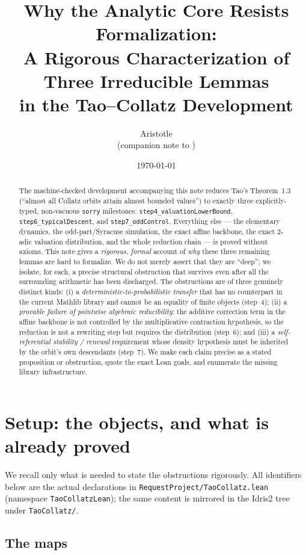 \documentclass[11pt]{article}
\title{\bfseries Why the Analytic Core Resists Formalization:\\
A Rigorous Characterization of Three Irreducible Lemmas\\
in the Tao--Collatz Development}
\author{Aristotle \\ \small (companion note to \code{RequestProject/TaoCollatz.lean})}
\date{\today}
\theoremstyle{plain}
\theoremstyle{definition}
\theoremstyle{remark}
\newcommand{\code}[1]{\texttt{\small #1}}
\begin{document}
\maketitle

\begin{abstract}
The machine-checked development accompanying this note reduces Tao's Theorem~1.3
(``almost all Collatz orbits attain almost bounded values'') to exactly three
explicitly-typed, non-vacuous \code{sorry} milestones:
\code{step4\_valuationLowerBound}, \code{step6\_typicalDescent}, and
\code{step7\_oddControl}. Everything else --- the elementary dynamics, the
odd-part/Syracuse simulation, the exact affine backbone, the exact $2$-adic
valuation distribution, and the whole reduction chain --- is proved without
axioms. This note gives a \emph{rigorous, formal} account of \emph{why} these
three remaining lemmas are hard to formalize. We do not merely assert that they
are ``deep''; we isolate, for each, a precise structural obstruction that
survives even after all the surrounding arithmetic has been discharged. The
obstructions are of three genuinely distinct kinds: (i) a
\emph{deterministic-to-probabilistic transfer} that has no counterpart in the
current Mathlib library and cannot be an equality of finite objects
(step~4); (ii) a \emph{provable failure of pointwise algebraic reducibility}:
the additive correction term in the affine backbone is not controlled by the
multiplicative contraction hypothesis, so the reduction is not a rewriting step
but requires the distribution (step~6); and (iii) a \emph{self-referential
stability / renewal} requirement whose density hypothesis must be inherited by
the orbit's own descendants (step~7). We make each claim precise as a stated
proposition or obstruction, quote the exact Lean goals, and enumerate the
missing library infrastructure.
\end{abstract}

\section{Setup: the objects, and what is already proved}
\label{sec:setup}

We recall only what is needed to state the obstructions rigorously. All
identifiers below are the actual declarations in
\code{RequestProject/TaoCollatz.lean} (namespace \code{TaoCollatzLean}); the same
content is mirrored in the Idris2 tree under \code{TaoCollatz/}.

\subsection{The maps}
\end{document}

